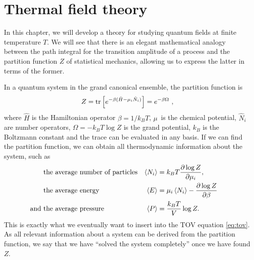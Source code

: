 \chapter{Thermal field theory}
\label{chap:tft}

\newcommand{\transampl}{\Braket{\phi_B | e^{- i \hat{H} T / \hbar} | \phi_A}}

In this chapter, we will develop a theory for studying quantum fields at finite temperature $T$.
We will see that there is an elegant mathematical analogy between the path integral for the transition amplitude of a process and the partition function $Z$ of statistical mechanics, allowing us to express the latter in terms of the former.

In a quantum system in the grand canonical ensemble, the partition function is 
\begin{equation}
	Z = \trace \left[ e^{-\beta (\hat{H} - \mu_i \hat{N}_i)} \right] = e^{-\beta \Omega} ,
\label{eq:tft:partition_function}
\end{equation}
where $\hat{H}$ is the Hamiltonian operator $\beta = 1 / k_B T$, $\mu$ is the chemical potential, $\hat{N}_i$ are number operators, $\Omega = -k_B T \log{Z}$ is the grand potential, $k_B$ is the Boltzmann constant and the trace can be evaluated in any basis.
If we can find the partition function, we can obtain all thermodynamic information about the system, such as \cite[chapter 5]{ref:jensoluf}
\begin{subequations}
\begin{align}
	            & \text{the average number of particles} & \thermalavg{N_i} & = k_B T \pdv{\log{Z}}{\mu_i},                    & \label{eq:tft:average_number} \\
	            & \text{the average energy}              & \thermalavg{E}   & = \mu_i \thermalavg{N_i} - \pdv{\log{Z}}{\beta}  & \label{eq:tft:average_energy} \\ %
	\text{and } & \text{the average pressure}            & \thermalavg{P}   & = \frac{k_B T}{V} \log{Z}.                       & \label{eq:tft:average_pressure} %
\end{align}
\end{subequations}
This is exactly what we eventually want to insert into the TOV equation \eqref{eq:tov}.
As all relevant information about a system can be derived from the partition function, we say that we have ``solved the system completely'' once we have found $Z$.

